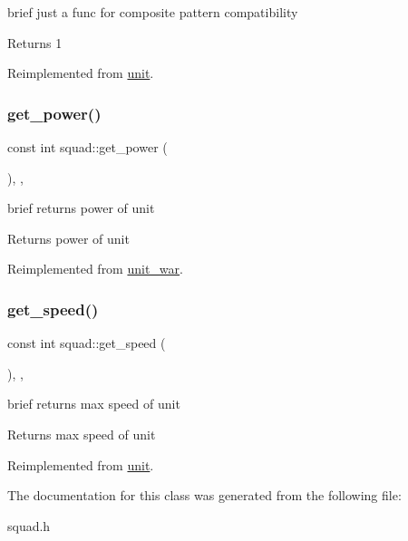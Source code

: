 brief just a func for composite pattern compatibility \begin{DoxyReturn}{Returns}
1 
\end{DoxyReturn}


Reimplemented from \mbox{\hyperlink{classunit_ab417b46197e2490f7fe279a9219e0f3c}{unit}}.

\mbox{\label{classsquad_a7e719229279a2dd4948f1949d2fe2ccc}} 
\subsubsection{\texorpdfstring{get\+\_\+power()}{get\_power()}}
{\footnotesize\ttfamily const int squad\+::get\+\_\+power (\begin{DoxyParamCaption}{ }\end{DoxyParamCaption})\hspace{0.3cm}{\ttfamily [inline]}, {\ttfamily [override]}, {\ttfamily [virtual]}}

brief returns power of unit \begin{DoxyReturn}{Returns}
power of unit 
\end{DoxyReturn}


Reimplemented from \mbox{\hyperlink{classunit__war_adea1fced490739cf8b7a6e49ec90cf59}{unit\+\_\+war}}.

\mbox{\label{classsquad_a61378460e6a249acba2c201572449691}} 
\subsubsection{\texorpdfstring{get\+\_\+speed()}{get\_speed()}}
{\footnotesize\ttfamily const int squad\+::get\+\_\+speed (\begin{DoxyParamCaption}{ }\end{DoxyParamCaption})\hspace{0.3cm}{\ttfamily [inline]}, {\ttfamily [override]}, {\ttfamily [virtual]}}

brief returns max speed of unit \begin{DoxyReturn}{Returns}
max speed of unit 
\end{DoxyReturn}


Reimplemented from \mbox{\hyperlink{classunit_af81d18961574843ddaa5273bfb57cf7f}{unit}}.



The documentation for this class was generated from the following file\+:\begin{DoxyCompactItemize}
\item 
squad.\+h\end{DoxyCompactItemize}

